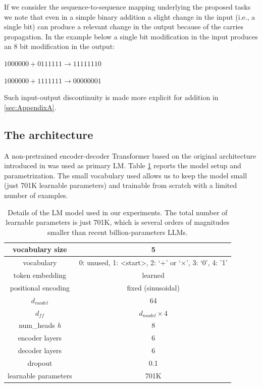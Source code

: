 \documentclass[final,1p,times,authoryear]{elsarticle}
\begin{document}
If we consider the sequence-to-sequence mapping underlying the proposed tasks we note that even in a simple binary addition a slight change in the input (i.e., a single bit) can produce a relevant change in the output because of the carries propagation. In the example below a single bit modification in the input produces an 8 bit modification in the output:

\begin{center}
$1000000+0111111 \rightarrow 11111110$

$1000000+1111111 \rightarrow 00000001$
\end{center}

Such input-output discontinuity is made more explicit for addition in \ref{sec:AppendixA}.

\subsection{The architecture} \label{subsec:TheArchitecture}

A non-pretrained encoder-decoder Transformer based on the original architecture introduced in \citet{Vaswani2017} was used as primary LM. Table \ref{table:LMDetails} reports the model setup and parametrization. The small vocabulary used allows us to keep the model small (just 701K learnable parameters) and trainable from scratch with a limited number of examples.

\begin{table}[h!]
\caption{Details of the LM model used in our experiments. The total number of learnable parameters is just 701K, which is several orders of magnitudes smaller than recent billion-parameters LLMs.}
\label{table:LMDetails}
\begin{center}
\begin{tabular}{ |c|c| } 
 \hline
 vocabulary size & 5 \\
 \hline
 vocabulary & {0: unused, 1: \textless start\textgreater, 2: ‘+’ or ‘×’, 3: ‘0’, 4: ’1’} \\ 
 \hline
 token embedding & learned \\
 \hline
 positional encoding & fixed (sinusoidal) \\
 \hline
 $d_{model}$ & 64 \\
 \hline
 $d_{ff}$ & $d_{model} \times 4$ \\
 \hline
 num\_heads \textit{h} & 8 \\
 \hline
 encoder layers & 6 \\
 \hline
 decoder layers & 6 \\
 \hline
 dropout & 0.1 \\
 \hline
 learnable parameters & 701K \\
 \hline
\end{tabular}
\end{center}
\end{table}
\end{document}
